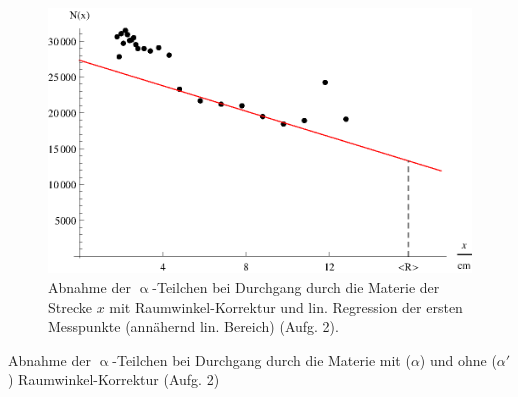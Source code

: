 \begin{figure}[tb]
	\centering
	\includegraphics[scale=1.0]{fig/ii_2_plotb.eps}
	\caption{Abnahme der $\upalpha$-Teilchen bei Durchgang durch die Materie der Strecke $x$ mit Raumwinkel-Korrektur und lin. Regression der ersten Messpunkte (annähernd lin. Bereich) (Aufg. 2).}
	\label{fig:ii_2_plotb}
\end{figure}

\begin{table}[tb]
	\centering
	\caption{Abnahme der $\upalpha$-Teilchen bei Durchgang durch die Materie mit ($\alpha$) und ohne ($\alpha'$) Raumwinkel-Korrektur (Aufg. 2)}
	\label{tab:ii_2}
	
\end{table}

\FloatBarrier
